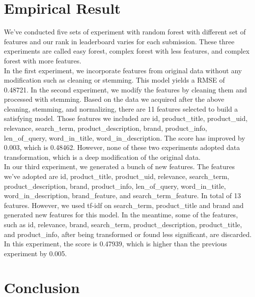 \documentclass{sig-alternate-05-2015}
\begin{document}
\section{Empirical Result}

We've conducted five sets of experiment with random forest with different set of features and our rank in leaderboard varies for each submission. These three experiments are called easy forest, complex forest with less features, and complex forest with more features. \\

In the first experiment, we incorporate features from original data without any modification such as cleaning or stemming. This model yields a RMSE of 0.48721. In the second experiment, we modify the features by cleaning them and processed with stemming. Based on the data we acquired after the above cleaning, stemming, and normalizing, there are 11 features selected to build a satisfying model. Those features we included are id,  product\_title, product\_uid, relevance, search\_term, product\_description, brand, product\_info, len\_of\_query, word\_in\_title, word\_in\_description. The score has improved by 0.003, which is 0.48462. However, none of these two experiments adopted data transformation, which is a deep modification of the original data.\\

In our third experiment, we generated a bunch of new features. The features we've adopted are  id,  product\_title, product\_uid, relevance, search\_term, product\_description, brand, product\_info, len\_of\_query, word\_in\_title, word\_in\_description, brand\_feature, and search\_term\_feature. In total of 13 features. However, we used tf-idf on search\_term, product\_title and brand and generated new features for this model. In the meantime, some of the features, such as id, relevance, brand, search\_term, product\_description, product\_title, and product\_info, after being transformed or found less significant, are discarded. In this experiment, the score is 0.47939, which is higher than the previous experiment by 0.005.



\section{Conclusion}
\end{document}
